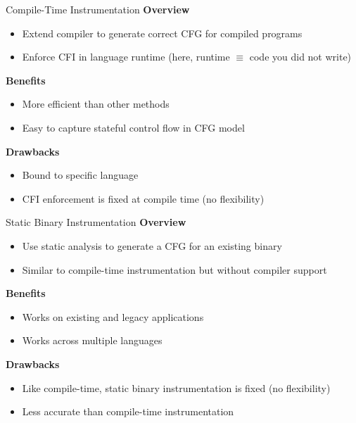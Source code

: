 \documentclass[12pt, dvipsnames, aspectratio=169]{beamer}
\newcommand{\red}[1]{{\color{red}#1}}
\newcommand{\blue}[1]{{\color{blue}#1}}
\begin{document}

\begin{frame}[c]{Compile-Time Instrumentation}{}
  {\bf Overview}
  \begin{itemize}
    \item Extend compiler to generate correct CFG for compiled programs
    \item Enforce CFI in language runtime (here, runtime $\equiv$ code you did not write)
  \end{itemize}

  \vfill
  {\bf \blue{Benefits}}
  \begin{itemize}
    \item More efficient than other methods
    \item Easy to capture stateful control flow in CFG model
  \end{itemize}

  \vfill
  {\bf \red{Drawbacks}}
  \begin{itemize}
    \item Bound to specific language
    \item CFI enforcement is fixed at compile time (no flexibility)
  \end{itemize}
\end{frame}

\begin{frame}[c]{Static Binary Instrumentation}{}
  {\bf Overview}
  \begin{itemize}
    \item Use static analysis to generate a CFG for an existing binary
    \item Similar to compile-time instrumentation but without compiler support
  \end{itemize}

  \vfill
  {\bf \blue{Benefits}}
  \begin{itemize}
    \item Works on existing and legacy applications
    \item Works across multiple languages
  \end{itemize}

  \vfill
  {\bf \red{Drawbacks}}
  \begin{itemize}
    \item Like compile-time, static binary instrumentation is fixed (no flexibility)
    \item Less accurate than compile-time instrumentation
  \end{itemize}
\end{frame}
\end{document}

